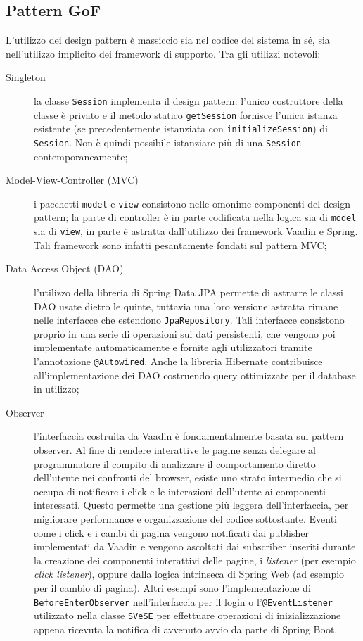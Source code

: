 \subsection{Pattern GoF}\label{GoF}
L'utilizzo dei design pattern è massiccio sia nel codice del sistema in sé, sia nell'utilizzo implicito dei framework di supporto. Tra gli utilizzi notevoli:
\begin{description}
	\item[Singleton] la classe \verb!Session! implementa il design pattern: l'unico costruttore della classe è privato e il metodo statico \verb!getSession! fornisce l'unica istanza esistente (se precedentemente istanziata con \verb!initializeSession!) di \verb!Session!. Non è quindi possibile istanziare più di una \verb!Session! contemporaneamente;
	\item[Model-View-Controller (MVC)] i pacchetti \verb!model! e \verb!view! consistono nelle omonime componenti del design pattern; la parte di controller è in parte codificata nella logica sia di \verb!model! sia di \verb!view!, in parte è astratta dall'utilizzo dei framework Vaadin e Spring. Tali framework sono infatti pesantamente fondati sul pattern MVC;
	\item[Data Access Object (DAO)] l'utilizzo della libreria di Spring Data JPA permette di astrarre le classi DAO usate dietro le quinte, tuttavia una loro versione astratta rimane nelle interfacce che estendono \verb!JpaRepository!. Tali interfacce consistono proprio in una serie di operazioni sui dati persistenti, che vengono poi implementate automaticamente e fornite agli utilizzatori tramite l'annotazione \verb!@Autowired!. Anche la libreria Hibernate contribuisce all'implementazione dei DAO costruendo query ottimizzate per il database in utilizzo;
	\item[Observer] l'interfaccia costruita da Vaadin è fondamentalmente basata sul pattern observer. Al fine di rendere interattive le pagine senza delegare al programmatore il compito di analizzare il comportamento diretto dell'utente nei confronti del browser, esiste uno strato intermedio che si occupa di notificare i click e le interazioni dell'utente ai componenti interessati. Questo permette una gestione più leggera dell'interfaccia, per migliorare performance e organizzazione del codice sottostante. Eventi come i click e i cambi di pagina vengono notificati dai publisher implementati da Vaadin e vengono ascoltati dai subscriber inseriti durante la creazione dei componenti interattivi delle pagine, i \emph{listener} (per esempio \emph{click listener}), oppure dalla logica intrinseca di Spring Web (ad esempio per il cambio di pagina). Altri esempi sono l'implementazione di \verb!BeforeEnterObserver! nell'interfaccia per il login o l'\verb!@EventListener! utilizzato nella classe \verb!SVeSE! per effettuare operazioni di inizializzazione appena ricevuta la notifica di avvenuto avvio da parte di Spring Boot.

\end{description}
